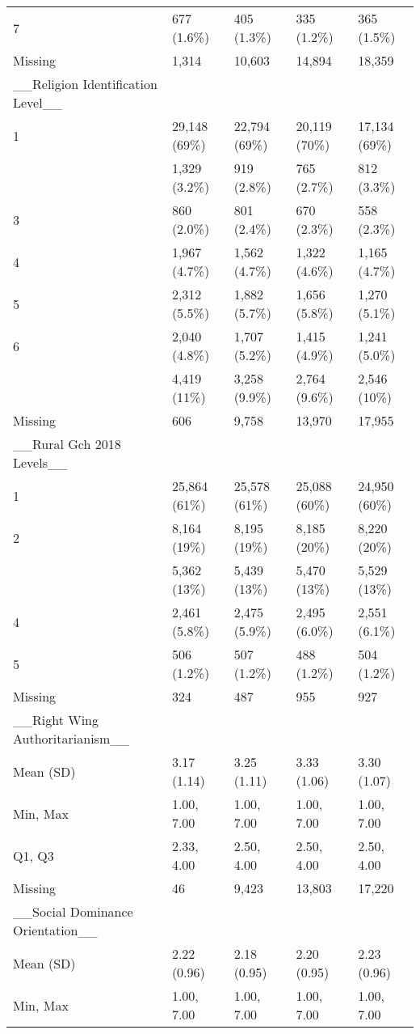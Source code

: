 \documentclass[
  single column]{article}
\begin{document}
\begin{longtable}[t]{lllll}
7 & 677 (1.6\%) & 405 (1.3\%) & 335 (1.2\%) & 365 (1.5\%)\\
Missing & 1,314 & 10,603 & 14,894 & 18,359\\
\_\_Religion Identification Level\_\_ &   ~~&   ~~&   ~~&   ~~\\
1 & 29,148 (69\%) & 22,794 (69\%) & 20,119 (70\%) & 17,134 (69\%)\\
\addlinespace
2 & 1,329 (3.2\%) & 919 (2.8\%) & 765 (2.7\%) & 812 (3.3\%)\\
3 & 860 (2.0\%) & 801 (2.4\%) & 670 (2.3\%) & 558 (2.3\%)\\
4 & 1,967 (4.7\%) & 1,562 (4.7\%) & 1,322 (4.6\%) & 1,165 (4.7\%)\\
5 & 2,312 (5.5\%) & 1,882 (5.7\%) & 1,656 (5.8\%) & 1,270 (5.1\%)\\
6 & 2,040 (4.8\%) & 1,707 (5.2\%) & 1,415 (4.9\%) & 1,241 (5.0\%)\\
\addlinespace
7 & 4,419 (11\%) & 3,258 (9.9\%) & 2,764 (9.6\%) & 2,546 (10\%)\\
Missing & 606 & 9,758 & 13,970 & 17,955\\
\_\_Rural Gch 2018 Levels\_\_ &  &   ~~&   ~~&   ~~\\
1 & 25,864 (61\%) & 25,578 (61\%) & 25,088 (60\%) & 24,950 (60\%)\\
2 & 8,164 (19\%) & 8,195 (19\%) & 8,185 (20\%) & 8,220 (20\%)\\
\addlinespace
3 & 5,362 (13\%) & 5,439 (13\%) & 5,470 (13\%) & 5,529 (13\%)\\
4 & 2,461 (5.8\%) & 2,475 (5.9\%) & 2,495 (6.0\%) & 2,551 (6.1\%)\\
5 & 506 (1.2\%) & 507 (1.2\%) & 488 (1.2\%) & 504 (1.2\%)\\
Missing & 324 & 487 & 955 & 927\\
\_\_Right Wing Authoritarianism\_\_ &   ~~&   ~~&   ~~&   ~~\\
\addlinespace
Mean (SD) & 3.17 (1.14) & 3.25 (1.11) & 3.33 (1.06) & 3.30 (1.07)\\
Min, Max & 1.00, 7.00 & 1.00, 7.00 & 1.00, 7.00 & 1.00, 7.00\\
Q1, Q3 & 2.33, 4.00 & 2.50, 4.00 & 2.50, 4.00 & 2.50, 4.00\\
Missing & 46 & 9,423 & 13,803 & 17,220\\
\_\_Social Dominance Orientation\_\_ &   ~~&   ~~&   ~~&   ~~\\
\addlinespace
Mean (SD) & 2.22 (0.96) & 2.18 (0.95) & 2.20 (0.95) & 2.23 (0.96)\\
Min, Max & 1.00, 7.00 & 1.00, 7.00 & 1.00, 7.00 & 1.00, 7.00\\

\end{longtable}
\end{document}
